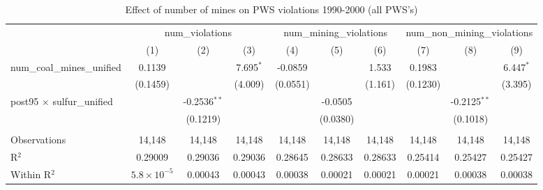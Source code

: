 
\begin{table}[htbp]
   \caption{\label{olsrf2sls_nummine_count_vio_1990to2000allhucs_coalunified} Effect of number of mines on PWS violations 1990-2000 (all PWS's)}
   \bigskip
   \centering
   \begin{adjustbox}{width = \textwidth, center}
      \begin{tabular}{lccccccccc}
         \toprule
          & \multicolumn{3}{c}{num\_violations} & \multicolumn{3}{c}{num\_mining\_violations} & \multicolumn{3}{c}{num\_non\_mining\_violations}\\
                                                          & (1)                  & (2)            & (3)           & (4)           & (5)           & (6)           & (7)           & (8)            & (9)\\  
         \midrule 
         num\_coal\_mines\_unified                        & 0.1139               &                & 7.695$^{*}$   & -0.0859       &               & 1.533         & 0.1983        &                & 6.447$^{*}$\\   
                                                          & (0.1459)             &                & (4.009)       & (0.0551)      &               & (1.161)       & (0.1230)      &                & (3.395)\\   
         post95 $\times$ sulfur\_unified                  &                      & -0.2536$^{**}$ &               &               & -0.0505       &               &               & -0.2125$^{**}$ &   \\   
                                                          &                      & (0.1219)       &               &               & (0.0380)      &               &               & (0.1018)       &   \\   
          \\
         Observations                                     & 14,148               & 14,148         & 14,148        & 14,148        & 14,148        & 14,148        & 14,148        & 14,148         & 14,148\\  
         R$^2$                                            & 0.29009              & 0.29036        & 0.29036       & 0.28645       & 0.28633       & 0.28633       & 0.25414       & 0.25427        & 0.25427\\  
         Within R$^2$                                     & $5.8\times 10^{-5}$  & 0.00043        & 0.00043       & 0.00038       & 0.00021       & 0.00021       & 0.00021       & 0.00038        & 0.00038\\  

\end{tabular}
\end{adjustbox}
\end{table}
